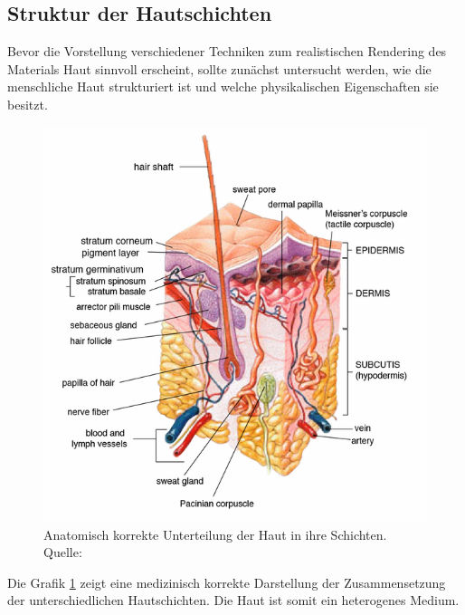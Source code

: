 \documentclass[ngerman,runningheads,a4paper]{llncs}[2018/03/10]
\begin{document}
\subsection{Struktur der Hautschichten}

Bevor die Vorstellung verschiedener Techniken zum realistischen Rendering des Materials Haut sinnvoll erscheint, sollte zunächst untersucht werden, wie die menschliche Haut strukturiert ist und welche physikalischen Eigenschaften sie besitzt.

\begin{figure}
  \centering
  \includegraphics[scale=0.275,keepaspectratio]{./images/skin-layers-medical.png}
  \caption{Anatomisch korrekte Unterteilung der Haut in ihre Schichten. Quelle: \cite{anatomic-skin-model}}
  \label{fig:real-skin-layers}
\end{figure}

Die Grafik \ref{fig:real-skin-layers} zeigt eine medizinisch korrekte Darstellung der Zusammensetzung der unterschiedlichen Hautschichten. Die Haut ist somit ein heterogenes Medium.
\end{document}
